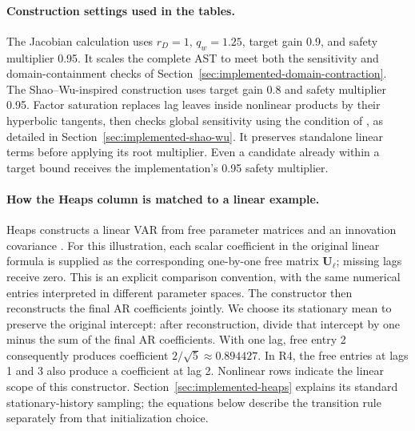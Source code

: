 \paragraph{Construction settings used in the tables.}
The Jacobian calculation uses $r_D=1$, $q_w=1.25$, target gain 0.9, and safety
multiplier 0.95. It scales the complete AST to meet both the sensitivity and
domain-containment checks of Section~\ref{sec:implemented-domain-contraction}.
The Shao--Wu-inspired construction uses target gain 0.8 and safety multiplier 0.95.
Factor saturation replaces lag leaves inside nonlinear products by their
hyperbolic tangents, then checks global sensitivity using the condition of
\citet[Theorem~5.1]{shao2007spectral}, as detailed in
Section~\ref{sec:implemented-shao-wu}. It preserves standalone linear terms
before applying its root multiplier. Even a candidate already within a
target bound receives the implementation's 0.95 safety multiplier.

\paragraph{How the Heaps column is matched to a linear example.}
Heaps constructs a linear VAR from free parameter matrices and an innovation
covariance \citep[Sections~2.1--2.2 and Appendix]{heaps2023stationarity}.
For this illustration, each scalar coefficient in the original linear formula
is supplied as the corresponding one-by-one free matrix $\mathbf U_\ell$;
missing lags receive zero. This is an explicit comparison convention, with
the same numerical entries interpreted in different parameter spaces.
The constructor then reconstructs the final AR coefficients jointly. We choose
its stationary mean to preserve the original intercept: after reconstruction,
divide that intercept by one minus the sum of the final AR coefficients.
With one lag, free entry 2 consequently produces coefficient
$2/\sqrt{5}\approx0.894427$. In R4, the free entries at lags 1 and 3 also
produce a coefficient at lag 2. Nonlinear rows indicate the linear scope of
this constructor. Section~\ref{sec:implemented-heaps} explains its standard
stationary-history sampling; the equations below describe the transition rule
separately from that initialization choice.

